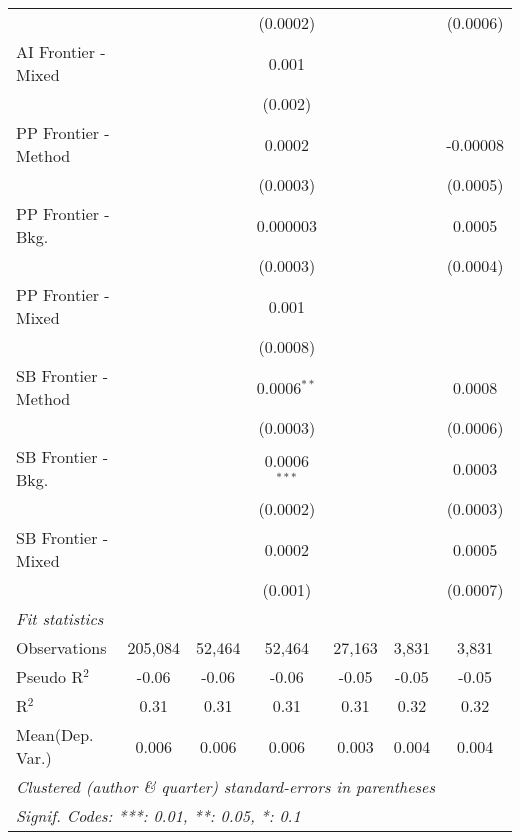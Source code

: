 \begin{tabular}{lcccccc}
                        &               &          & (0.0002)       &          &              & (0.0006)\\   
   AI Frontier - Mixed  &               &          & 0.001          &          &              &   \\   
                        &               &          & (0.002)        &          &              &   \\   
   PP Frontier - Method &               &          & 0.0002         &          &              & -0.00008\\   
                        &               &          & (0.0003)       &          &              & (0.0005)\\   
   PP Frontier - Bkg.   &               &          & 0.000003       &          &              & 0.0005\\   
                        &               &          & (0.0003)       &          &              & (0.0004)\\   
   PP Frontier - Mixed  &               &          & 0.001          &          &              &   \\   
                        &               &          & (0.0008)       &          &              &   \\   
   SB Frontier - Method &               &          & 0.0006$^{**}$  &          &              & 0.0008\\   
                        &               &          & (0.0003)       &          &              & (0.0006)\\   
   SB Frontier - Bkg.   &               &          & 0.0006$^{***}$ &          &              & 0.0003\\   
                        &               &          & (0.0002)       &          &              & (0.0003)\\   
   SB Frontier - Mixed  &               &          & 0.0002         &          &              & 0.0005\\   
                        &               &          & (0.001)        &          &              & (0.0007)\\   
   \midrule
   \emph{Fit statistics}\\
   Observations         & 205,084       & 52,464   & 52,464         & 27,163   & 3,831        & 3,831\\  
   Pseudo R$^2$         & -0.06         & -0.06    & -0.06          & -0.05    & -0.05        & -0.05\\  
   R$^2$                & 0.31          & 0.31     & 0.31           & 0.31     & 0.32         & 0.32\\  
Mean(Dep. Var.) & 0.006 & 0.006 & 0.006 & 0.003 & 0.004 & 0.004 \\
   \midrule \midrule
   \multicolumn{7}{l}{\emph{Clustered (author \& quarter) standard-errors in parentheses}}\\
   \multicolumn{7}{l}{\emph{Signif. Codes: ***: 0.01, **: 0.05, *: 0.1}}\\
\end{tabular}
\par\endgroup
